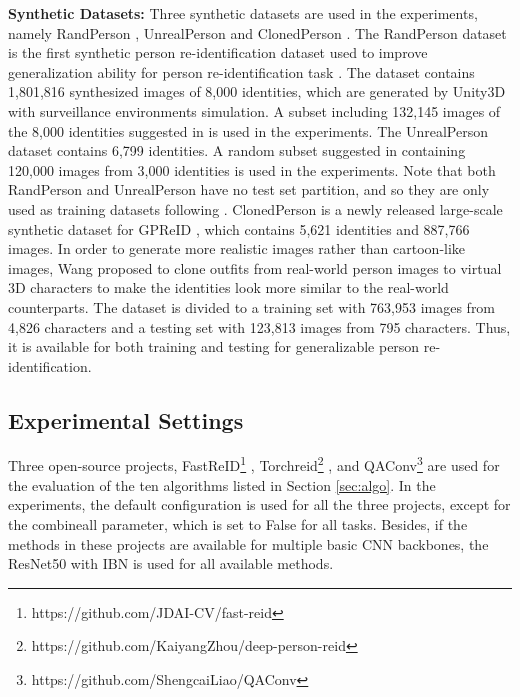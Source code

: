 \documentclass[10pt,twocolumn,letterpaper]{article}
\begin{document}
\textbf{Synthetic Datasets:} Three synthetic datasets are used in the experiments, namely RandPerson \cite{wang20rand}, UnrealPerson \cite{zhang2021unrealperson} and ClonedPerson \cite{Wang-2022-Clonedperson}.
The RandPerson dataset is the first synthetic person re-identification dataset used to improve generalization ability for person re-identification task \cite{wang20rand}. The dataset contains 1,801,816 synthesized images of 8,000 identities, which are generated by Unity3D with surveillance environments simulation. A subset including 132,145 images of the 8,000 identities suggested in \cite{wang20rand} is used in the experiments. The UnrealPerson dataset contains 6,799 identities. A random subset suggested in \cite{zhang2021unrealperson} containing 120,000 images from 3,000 identities is used in the experiments. Note that both RandPerson and UnrealPerson have no test set partition, and so they are only used as training datasets following \cite{wang20rand,zhang2021unrealperson}. 
ClonedPerson is a newly released large-scale synthetic dataset for GPReID \cite{Wang-2022-Clonedperson}, which contains 5,621 identities and 887,766 images. In order to generate more realistic images rather than cartoon-like images, Wang \etal proposed to clone outfits from real-world person images to virtual 3D characters to make the identities look more similar to the real-world counterparts. The dataset is divided to a training set with 763,953 images from 4,826 characters and a testing set with 123,813 images from 795 characters. Thus, it is available for both training and testing for generalizable person re-identification.




\subsection{Experimental Settings}

Three open-source projects,  FastReID\footnote{https://github.com/JDAI-CV/fast-reid} \cite{he2020fastreid}, Torchreid\footnote{https://github.com/KaiyangZhou/deep-person-reid} \cite{torchreid}, and QAConv\footnote{https://github.com/ShengcaiLiao/QAConv} \cite{liao2020interpretable,Liao-2021-QAConv-GS} are used for the evaluation of the ten algorithms listed in Section \ref{sec:algo}. In the experiments, the default configuration is used for all the three projects, except for the combineall parameter, which is set to False for all tasks. Besides, if the methods in these projects are available for multiple basic CNN backbones, the ResNet50 with IBN \cite{pan2018two,jia2019frustratingly} is used for all available methods.
\end{document}
